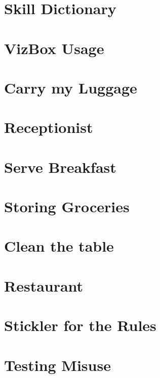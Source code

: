 \documentclass{article}
\begin{document}

\newpage


\section*{Skill Dictionary}

\RenderCategoryDictionary

\newpage
\section{VizBox Usage}



\newpage
\section{Carry my Luggage}




\newpage
\section{Receptionist}




\newpage
\section{Serve Breakfast}




\newpage
\section{Storing Groceries}




\newpage
\section{Clean the table}




\newpage
\section{Restaurant}




\newpage
\section{Stickler for the Rules}




\newpage
\section{Testing Misuse}


\end{document}
